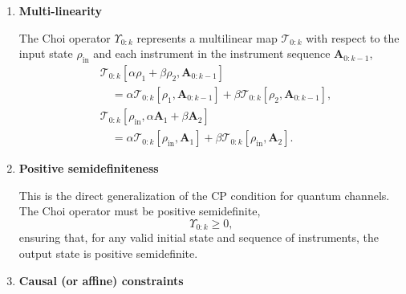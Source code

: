 \documentclass[
    aps,
    prx,
    reprint,
    superscriptaddress,
    longbibliography,
    nofootinbib,
    floatfix,
]{revtex4-2}
\begin{document}
\begin{enumerate}
    \item \textbf{Multi-linearity}

    The Choi operator \(\Upsilon_{0:k}\) represents a multilinear map \(\mathcal{T}_{0:k}\) with respect to the input state \(\rho_{\mathrm{in}}\) and each instrument in the instrument sequence \(\mathbf{A}_{0:k-1}\),
    \begin{equation}
        \begin{aligned}
        &\mathcal{T}_{0:k}[\alpha\rho_1 + \beta\rho_2, \mathbf{A}_{0:k-1}] \\
        &\quad =
        \alpha\mathcal{T}_{0:k}[\rho_1, \mathbf{A}_{0:k-1}]
        + \beta\mathcal{T}_{0:k}[\rho_2, \mathbf{A}_{0:k-1}], \\[0.5em]
        &\mathcal{T}_{0:k}[\rho_{\mathrm{in}}, \alpha\mathbf{A}_1 + \beta\mathbf{A}_2] \\
        &\quad =
        \alpha\mathcal{T}_{0:k}[\rho_{\mathrm{in}}, \mathbf{A}_1]
        + \beta\mathcal{T}_{0:k}[\rho_{\mathrm{in}}, \mathbf{A}_2].
        \end{aligned}
    \end{equation}

    \item \textbf{Positive semidefiniteness}
    
    This is the direct generalization of the CP condition for quantum channels. The Choi operator must be positive semidefinite,
    \begin{equation}
        \Upsilon_{0:k} \geq 0,
    \end{equation}
    ensuring that, for any valid initial state and sequence of instruments, the output state is positive semidefinite.
    \item \textbf{Causal (or affine) constraints}
    

\end{enumerate}
\end{document}
